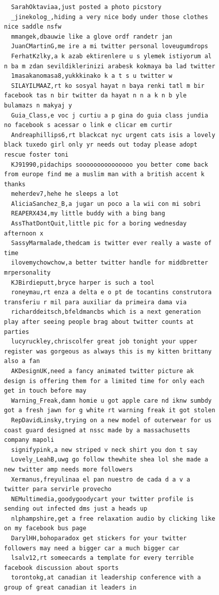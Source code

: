 \begin{figure}[htpb]
\begin{verbatim}
  SarahOktaviaa,just posted a photo picstory
  _jinekolog_,hiding a very nice body under those clothes nice saddle nsfw
  mmangek,dbauwie like a glove ordf randetr jan
  JuanCMartinG,me ire a mi twitter personal loveugumdrops
  FerhatKzlky,a k azab ektirenlere u s ylemek istiyorum al n ba m zdan sevildiklerinizi arabesk kokmaya ba lad twitter
  1masakanomasa8,yukkkinako k a t s u twitter w
  SILAYILMAAZ,rt ko sosyal hayat n baya renki tatl m bir facebook tas n bir twitter da hayat n n a k n b yle bulamazs n makyaj y
  Guia_Class,e voc j curtiu a p gina do guia class jundia no facebook s acessar o link e clicar em curtir
  Andreaphillips6,rt blackcat nyc urgent cats isis a lovely black tuxedo girl only yr needs out today please adopt rescue foster toni
  KJ91990,pidachips sooooooooooooooo you better come back from europe find me a muslim man with a british accent k thanks
  meherdev7,hehe he sleeps a lot
  AliciaSanchez_B,a jugar un poco a la wii con mi sobri
  REAPERX434,my little buddy with a bing bang
  AssThatDontQuit,little pic for a boring wednesday afternoon x
  SassyMarmalade,thedcam is twitter ever really a waste of time
  ilovemychowchow,a better twitter handle for middbretter mrpersonality
  KJBirdieputt,bryce harper is such a tool
  roneymau,rt enza a delta e o pt de tocantins construtora transferiu r mil para auxiliar da primeira dama via
  richarddeitsch,bfeldmancbs which is a next generation play after seeing people brag about twitter counts at parties
  lucyruckley,chriscolfer great job tonight your upper register was gorgeous as always this is my kitten brittany also a fan
  AKDesignUK,need a fancy animated twitter picture ak design is offering them for a limited time for only each get in touch before may
  Warning_Freak,damn homie u got apple care nd iknw sumbdy got a fresh jawn for g white rt warning freak it got stolen
  RepDavidLinsky,trying on a new model of outerwear for us coast guard designed at nssc made by a massachusetts company mapoli
  signifypink,a new striped v neck shirt you don t say
  Lovely_LeahB,uwg go follow thewhite shea lol she made a new twitter amp needs more followers
  Xermanus,freyulinaa el pan nuestro de cada d a v a twitter para servirle provecho
  NEMultimedia,goodygoodycart your twitter profile is sending out infected dms just a heads up
  nlphampshire,get a free relaxation audio by clicking like on my facebook bus page
  DarylHH,bohoparadox get stickers for your twitter followers may need a bigger car a much bigger car
  lsalv12,rt someecards a template for every terrible facebook discussion about sports
  torontokg,at canadian it leadership conference with a group of great canadian it leaders in

\end{verbatim}
\end{figure}
